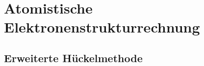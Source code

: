 \section{Atomistische Elektronenstrukturrechnung}
\label{cha:atomistischeelektronenstrukturrechnung}

\subsection{Erweiterte Hückelmethode}
\label{cha:erweitertehueckelmethode}
